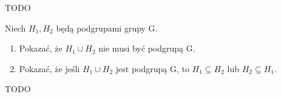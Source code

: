 \begin{solution}

	TODO
\end{solution}
\begin{problem}[15]

	Niech $H_1, H_2$ będą podgrupami grupy G.
	\begin{enumerate}[label=\alph*)]
		\item Pokazać, że $H_1\cup H_2$ nie musi być podgrupą G.
		\item Pokazać, że jeśli $H_1\cup H_2$ jest podgrupą G, to $H_1 \subseteq H_2$ lub $H_2 \subseteq  H_1.$
	\end{enumerate}
\end{problem}
\begin{solution}

	TODO
\end{solution}
